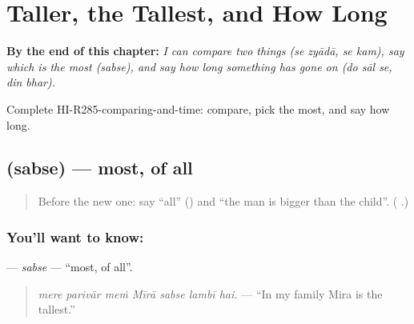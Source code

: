 
\chapter{Taller, the Tallest, and How Long}
\label{ch:hi-taller-the-tallest-and-how-long}

\begin{chapteropening}
\textbf{By the end of this chapter:} \emph{I can compare two things (se zyādā, se kam), say which is the most (sabse), and say how long something has gone on (do sāl se, din bhar).}

Complete HI-R285-comparing-and-time: compare, pick the most, and say how long.
\end{chapteropening}

\section[\texorpdfstring{\hi{सबसे} (sabse)}{सबसे (sabse)}]{ (sabse) — most, of all}

\label{lesson:HI-C285-sabse}



\begin{quote}
Before the new one: say \textquotedblleft{}all\textquotedblright{} (\textbf{}) and \textquotedblleft{}the man is bigger than the child\textquotedblright{}. (\textbf{    }.)
\end{quote}

\subsection*{You'll want to know: }
\textbf{} — \emph{sabse} — \textquotedblleft{}most, of all\textquotedblright{}.

\begin{quote}
\textbf{      }
\end{quote}

\begin{quote}
\emph{mere parivār meṁ Mīrā sabse lambī hai.} — \textquotedblleft{}In my family Mira is the tallest.\textquotedblright{}
\end{quote}

